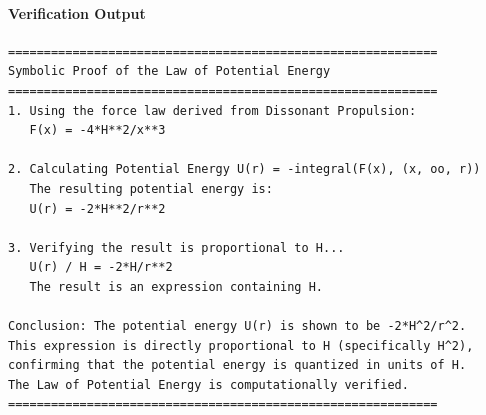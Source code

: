 \paragraph{Verification Output}
\begin{verbatim}
============================================================
Symbolic Proof of the Law of Potential Energy
============================================================
1. Using the force law derived from Dissonant Propulsion:
   F(x) = -4*H**2/x**3

2. Calculating Potential Energy U(r) = -integral(F(x), (x, oo, r))
   The resulting potential energy is:
   U(r) = -2*H**2/r**2

3. Verifying the result is proportional to H...
   U(r) / H = -2*H/r**2
   The result is an expression containing H.

Conclusion: The potential energy U(r) is shown to be -2*H^2/r^2.
This expression is directly proportional to H (specifically H^2),
confirming that the potential energy is quantized in units of H.
The Law of Potential Energy is computationally verified.
============================================================
\end{verbatim}